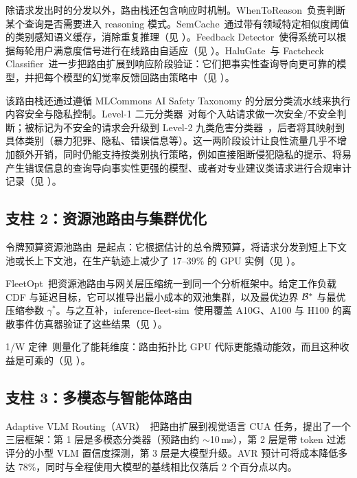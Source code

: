 除请求发出时的分发以外，路由栈还包含响应时机制。WhenToReason~\cite{wang2025reason}负责判断某个查询是否需要进入 reasoning 模式。SemCache~\cite{wang2025cache}通过带有领域特定相似度阈值的类别感知语义缓存，消除重复推理（见 ）。Feedback Detector~\cite{feedbackdet2026}使得系统可以根据每轮用户满意度信号进行在线路由自适应（见 ）。HaluGate~\cite{halugate2025}与 Factcheck Classifier~\cite{factcheck2026}进一步把路由扩展到响应阶段验证：它们把事实性查询导向更可靠的模型，并把每个模型的幻觉率反馈回路由策略中（见 ）。

该路由栈还通过遵循 MLCommons AI Safety Taxonomy 的分层分类流水线来执行内容安全与隐私控制。Level-1 二元分类器~\cite{safetyl1_2026}对每个入站请求做一次安全/不安全判断；被标记为不安全的请求会升级到 Level-2 九类危害分类器~\cite{safetyl2_2026}，后者将其映射到具体类别（暴力犯罪、隐私、错误信息等）。这一两阶段设计让良性流量几乎不增加额外开销，同时仍能支持按类别执行策略，例如直接阻断侵犯隐私的提示、将易产生错误信息的查询导向事实性更强的模型、或者对专业建议类请求进行合规审计记录（见 ）。

\subsection{支柱 2：资源池路由与集群优化}
\label{sec:foundation:fleet}

令牌预算资源池路由~\cite{poolrouting2026}是起点：它根据估计的总令牌预算，将请求分发到短上下文池或长上下文池，在生产轨迹上减少了 17--39\% 的 GPU 实例（见 ）。

FleetOpt~\cite{fleetopt2026}把资源池路由与网关层压缩统一到同一个分析框架中。给定工作负载 CDF 与延迟目标，它可以推导出最小成本的双池集群，以及最优边界 $\mathcal{B}^*$ 与最优压缩参数 $\gamma^*$。与之互补，inference-fleet-sim~\cite{fleetsim2026}使用覆盖 A10G、A100 与 H100 的离散事件仿真器验证了这些结果（见 ）。

1/W 定律~\cite{onewlaw2026}则量化了能耗维度：路由拓扑比 GPU 代际更能撬动能效，而且这种收益是可乘的（见 ）。

\subsection{支柱 3：多模态与智能体路由}
\label{sec:foundation:agent}

Adaptive VLM Routing（AVR）~\cite{avr2026}把路由扩展到视觉语言 CUA 任务，提出了一个三层框架：第 1 层是多模态分类器（预路由约 $\sim$10\,ms），第 2 层是带 token 过滤评分的小型 VLM 置信度探测，第 3 层是大模型升级。AVR 预计可将成本降低多达 78\%，同时与全程使用大模型的基线相比仅落后 2 个百分点以内。

